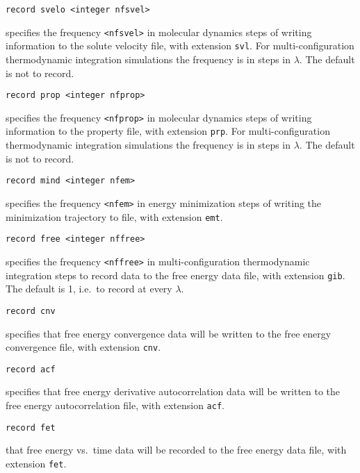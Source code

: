 \begin{description}
\item
\begin{verbatim}
record svelo <integer nfsvel>
\end{verbatim}
specifies the frequency \verb+<nfsvel>+ in molecular dynamics steps
of writing information to the solute velocity file, with extension
\verb+svl+. For multi-configuration
thermodynamic integration simulations the frequency is in
steps in $\lambda$. The default is not to record.

\item
\begin{verbatim}
record prop <integer nfprop>
\end{verbatim}
specifies the frequency \verb+<nfprop>+ in molecular dynamics steps
of writing information to the property file, with extension
\verb+prp+. For multi-configuration
thermodynamic integration simulations the frequency is in
steps in $\lambda$. The default is not to record.

\item
\begin{verbatim}
record mind <integer nfem>
\end{verbatim}
specifies the frequency \verb+<nfem>+ in energy minimization steps of
writing the minimization trajectory to file, with extension \verb+emt+.

\item
\begin{verbatim}
record free <integer nffree>
\end{verbatim}
specifies the frequency \verb+<nffree>+ in multi-configuration
thermodynamic integration steps to record data to the
free energy data file, with extension \verb+gib+.
The default is 1, i.e.\ to record at every $\lambda$.

\item
\begin{verbatim}
record cnv
\end{verbatim}
specifies that free energy convergence data will be written to the
free energy convergence file, with extension \verb+cnv+.

\item
\begin{verbatim}
record acf
\end{verbatim}
specifies that free energy derivative autocorrelation data will be
written to the free energy autocorrelation file, with extension
\verb+acf+.

\item
\begin{verbatim}
record fet
\end{verbatim}
that free energy vs.\ time data will be recorded to the free energy
data file, with extension \verb+fet+.


\end{description}

